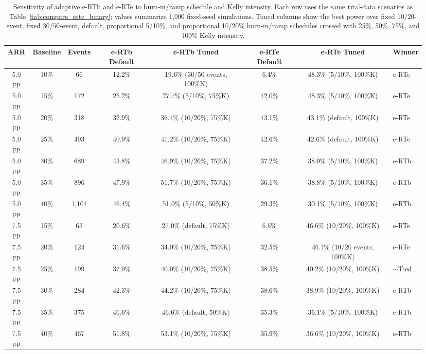 \begin{table}[htbp]
\centering
\scriptsize
\setlength{\tabcolsep}{3pt}
\caption{Sensitivity of adaptive e-RTb and e-RTe to burn-in/ramp schedule and Kelly intensity. Each row uses the same trial-data scenarios as Table~\ref{tab:compare_erte_binary}; values summarize 1{,}000 fixed-seed simulations. Tuned columns show the best power over fixed 10/20-event, fixed 30/50-event, default, proportional 5/10\%, and proportional 10/20\% burn-in/ramp schedules crossed with 25\%, 50\%, 75\%, and 100\% Kelly intensity.}
\begin{tabular}{@{}cccccccl@{}}
\toprule
ARR & Baseline & Events & e-RTb Default & e-RTb Tuned & e-RTe Default & e-RTe Tuned & Winner \\
\midrule
5.0 pp & 10\% & 66 & 12.2\% & 19.6\% (30/50 events, 100\%K) & 6.4\% & 48.3\% (5/10\%, 100\%K) & e-RTe \\
5.0 pp & 15\% & 172 & 25.2\% & 27.7\% (5/10\%, 75\%K) & 42.0\% & 48.3\% (5/10\%, 100\%K) & e-RTe \\
5.0 pp & 20\% & 318 & 32.9\% & 36.4\% (10/20\%, 75\%K) & 43.1\% & 43.1\% (default, 100\%K) & e-RTe \\
5.0 pp & 25\% & 493 & 40.9\% & 41.2\% (10/20\%, 75\%K) & 42.6\% & 42.6\% (default, 100\%K) & e-RTe \\
5.0 pp & 30\% & 689 & 43.8\% & 46.9\% (10/20\%, 75\%K) & 37.2\% & 38.0\% (5/10\%, 100\%K) & e-RTb \\
5.0 pp & 35\% & 896 & 47.9\% & 51.7\% (10/20\%, 75\%K) & 36.1\% & 38.8\% (5/10\%, 100\%K) & e-RTb \\
5.0 pp & 40\% & 1{,}104 & 46.4\% & 51.0\% (5/10\%, 50\%K) & 29.3\% & 30.1\% (5/10\%, 100\%K) & e-RTb \\
7.5 pp & 15\% & 63 & 20.6\% & 27.0\% (default, 75\%K) & 6.6\% & 46.6\% (10/20\%, 100\%K) & e-RTe \\
7.5 pp & 20\% & 124 & 31.6\% & 34.0\% (10/20\%, 75\%K) & 32.5\% & 46.1\% (10/20 events, 100\%K) & e-RTe \\
7.5 pp & 25\% & 199 & 37.9\% & 40.0\% (10/20\%, 75\%K) & 38.5\% & 40.2\% (10/20\%, 100\%K) & $\sim$Tied \\
7.5 pp & 30\% & 284 & 42.3\% & 44.2\% (10/20\%, 75\%K) & 38.6\% & 38.9\% (10/20\%, 100\%K) & e-RTb \\
7.5 pp & 35\% & 375 & 46.6\% & 46.6\% (default, 50\%K) & 35.3\% & 36.1\% (5/10\%, 100\%K) & e-RTb \\
7.5 pp & 40\% & 467 & 51.8\% & 53.1\% (10/20\%, 75\%K) & 35.9\% & 36.6\% (10/20\%, 100\%K) & e-RTb \\

\end{tabular}
\end{table}
